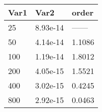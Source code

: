 \begin{tabular}{lll}
Var1 & Var2 & order \\ 
\hline 
25 & 8.93e-14 & ------ \\ 
50 & 4.14e-14 & 1.1086 \\ 
100 & 1.19e-14 & 1.8012 \\ 
200 & 4.05e-15 & 1.5521 \\ 
400 & 3.02e-15 & 0.4245 \\ 
800 & 2.92e-15 & 0.0463 \\ 
\hline 
\end{tabular}